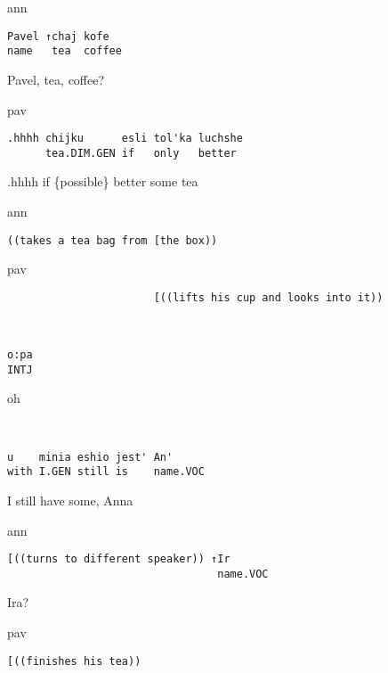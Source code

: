 \documentclass[output=paper,modfonts,nonflat]{langsci/langscibook}
\begin{document}
\vspace{2mm}
%
\begin{transbox}{1}{ann}
\begin{verbatim}
Pavel ↑chaj kofe
name   tea  coffee
\end{verbatim}
Pavel, tea, coffee?
\end{transbox}
%
%
\begin{transbox}{3}{pav}
\begin{verbatim}
.hhhh chijku      esli tol'ka luchshe
      tea.DIM.GEN if   only   better
\end{verbatim}
.hhhh if \{possible\} better some tea %
\end{transbox}
%
\begin{transbox}{4}{ann}
\begin{verbatim}
((takes a tea bag from [the box))
\end{verbatim}
\end{transbox}
%
\begin{transbox}{5}{pav}
\begin{verbatim}
                       [((lifts his cup and looks into it))
\end{verbatim}
\end{transbox}
%
\begin{transbox}{6}{~}
\begin{verbatim}
o:pa
INTJ
\end{verbatim}
oh
\end{transbox}
%
\begin{transbox}{7}{~}
\begin{verbatim}
u    minia eshio jest' An'
with I.GEN still is    name.VOC
\end{verbatim}
I still have some, Anna
\end{transbox}
%
\begin{transbox}{8}{ann}
\begin{verbatim}
[((turns to different speaker)) ↑Ir
                                 name.VOC
\end{verbatim}
\hspace{4.9cm} Ira?
\end{transbox}
%
\begin{transbox}{9}{pav}
\begin{verbatim}
[((finishes his tea))
\end{verbatim}
\end{transbox}
\end{document}
